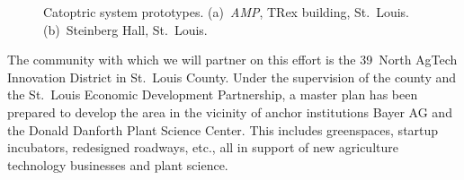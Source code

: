 \begin{figure}[ht]
\centering
{}
\quad %
{}
\caption{Catoptric system prototypes.
(a)~\emph{AMP}, TRex building, St.~Louis.
(b)~Steinberg Hall, St.~Louis.
}
\label{fig:proto}
\end{figure}

The community with which we will partner on this effort is
the 39~North AgTech Innovation District in St.~Louis County. Under the
supervision of the county and the St.~Louis Economic Development Partnership, 
a master plan has been prepared to develop the area in the vicinity of  
anchor institutions Bayer AG and the Donald Danforth Plant Science Center. 
This includes greenspaces, startup incubators, redesigned roadways, etc.,
all in support of new agriculture technology businesses and plant science.
